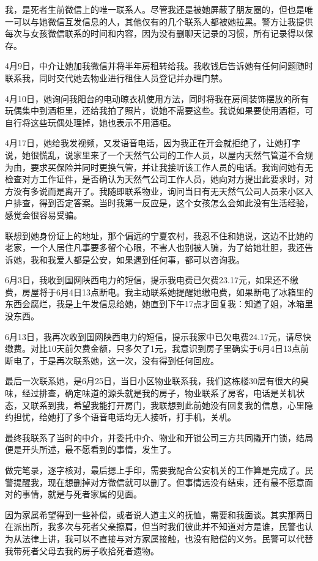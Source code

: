 我，是死者生前微信上的唯一联系人。尽管我还是被她屏蔽了朋友圈的，但也是唯一可以与她微信互发信息的人，其他仅有的几个联系人都被她拉黑。警方让我提供每次与女孩微信联系的时间和内容，因为没有删聊天记录的习惯，所有记录得以保存。

4月9日，中介让她加我微信并将半年房租转给我。我收钱后告诉她有任何问题随时联系我，同时交代她去物业进行租住人员登记并办理门禁。

4月10日，她询问我阳台的电动晾衣机使用方法，同时将我在房间装饰摆放的所有玩偶集中到酒柜里，还给我拍了照片，说她不需要这些。我说如果要使用酒柜，可自行将这些玩偶处理掉，她也表示不用酒柜。

4月17日，她给我发视频，又发语音电话，因为我正在开会就拒绝了，让她打字说，她很慌乱，说家里来了一个天然气公司的工作人员，以屋内天然气管道不合规为由，要求买保险并同时更换气管，并让我接听该工作人员的电话。我询问她有无检查对方工作证件，是否确认为天然气公司工作人员，她向对方提出此要求时，对方没有多说而是离开了。我随即联系物业，询问当日有无天然气公司人员来小区入户排查，得到否定答案。当时我第一反应是，这个女孩怎么会如此没有生活经验，感觉会很容易受骗。

联想到她身份证上的地址，那个偏远的宁夏农村，我忍不住和她说，这边不比她的老家，一个人居住凡事要多留个心眼，不害人也别被人骗，为了给她壮胆，我还告诉她，我和我爱人都是公安，如果遇到任何事，都可以咨询我。

6月3日，我收到国网陕西电力的短信，提示我电费已欠费23.17元，如果还不缴费，房屋将于6月4日13点断电。我主动联系她提醒她缴电费，如果断电了冰箱里的东西会腐烂，我是上午发信息给她，她直到下午17点才回复我：知道了姐，冰箱里没东西。

6月13日，我再次收到国网陕西电力的短信，提示我家中已欠电费24.17元，请尽快缴费。对比10天前欠费金额，只多欠了1元，我意识到房子里确实于6月4日13点前断电了，于是再次联系她，这一次，没有得到任何回应。

最后一次联系她，是6月25日，当日小区物业联系我，我们这栋楼30层有很大的臭味，经过排查，确定味道的源头就是我的房子，物业联系了房客，电话是关机状态，又联系到我，希望我能打开房门，我联想到此前她没有回复我的信息，心里隐约担忧，给她打了多个语音电话均无人接听，打手机，关机。

最终我联系了当时的中介，并委托中介、物业和开锁公司三方共同撬开门锁，结局便是开头所述，最不愿看到的事情，发生了。

做完笔录，逐字核对，最后摁上手印，需要我配合公安机关的工作算是完成了。民警提醒我，现在想删掉对方微信就可以删了。但事情远没有结束，还有最不愿意面对的事情，就是与死者家属的见面。

因为家属希望得到一些补偿，或者说人道主义的抚恤，需要和我面谈。其实那两日在派出所，我多次与死者父亲擦肩，但当时我们彼此并不知道对方是谁，民警也认为从法律上讲，我可以不直接与对方家属接触，也没有赔偿的义务。民警可以代替我带死者父母去我的房子收拾死者遗物。

